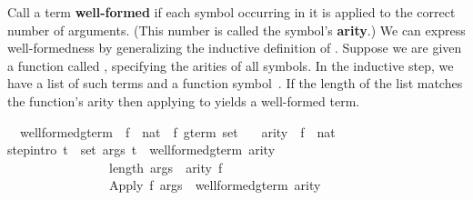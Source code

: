 \begin{isabellebody}
\begin{isamarkuptext}
Call a term \textbf{well-formed} if each symbol occurring in it is applied
to the correct number of arguments.  (This number is called the symbol's
\textbf{arity}.)  We can express well-formedness by
generalizing the inductive definition of
.
Suppose we are given a function called , specifying the arities
of all symbols.  In the inductive step, we have a list  of such
terms and a function  symbol~. If the length of the list matches the
function's arity  then applying  to  yields a well-formed
term.%
\end{isamarkuptext}%
\isamarkuptrue%
\isamarkupfalse%
\isanewline
\ \ well{}formed{}gterm\ {}{}\ {}{}{}f\ {}\ nat{}\ {}\ {}f\ gterm\ set{}\isanewline
\ \ \ arity\ {}{}\ {}{}f\ {}\ nat{}\isanewline
{}\isanewline
step{}intro{}{}{}\ {}{}{}t\ {}\ set\ args{}\ t\ {}\ well{}formed{}gterm\ arity{}\ \ \isanewline
\ \ \ \ \ \ \ \ \ \ \ \ \ \ \ \ length\ args\ {}\ arity\ f{}\isanewline
\ \ \ \ \ \ \ \ \ \ \ \ \ \ \ {}\ {}Apply\ f\ args{}\ {}\ well{}formed{}gterm\ arity{}%

\end{isabellebody}
